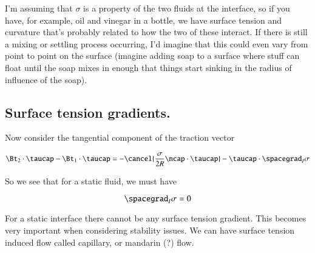 I'm assuming that $\sigma$ is a property of the two fluids at the interface, so if you have, for example, oil and vinegar in a bottle, we have surface tension and curvature that's probably related to how the two of these interact.  If there is still a mixing or settling process occurring, I'd imagine that this could even vary from point to point on the surface (imagine adding soap to a surface where stuff can float until the soap mixes in enough that things start sinking in the radius of influence of the soap).

\subsection{Surface tension gradients.}

Now consider the tangential component of the traction vector

\begin{equation}\label{eqn:continuumL15:90}
\Bt_2 \cdot \taucap - \Bt_1 \cdot \taucap = - \cancel{ \frac{\sigma}{2 R} \ncap \cdot \taucap} - \taucap \cdot \spacegrad_I \sigma
\end{equation}

So we see that for a static fluid, we must have

\begin{equation}\label{eqn:continuumL15:110}
\spacegrad_I \sigma = 0
\end{equation}

For a static interface there cannot be any surface tension gradient.  This becomes very important when considering stability issues.  We can have surface tension induced flow called capillary, or mandarin (?) flow.
